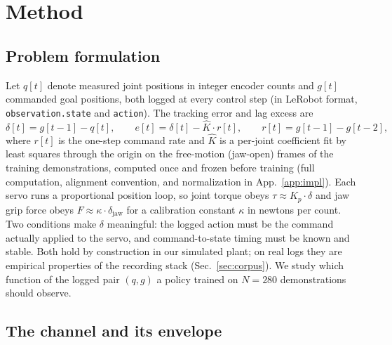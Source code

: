 \documentclass{article}
\begin{document}

\section{Method}
\label{sec:method}

\subsection{Problem formulation}
\label{sec:formulation}

Let $q[t]$ denote measured joint positions in integer encoder counts and
$g[t]$ commanded goal positions, both logged at every control step (in
LeRobot format, \texttt{observation.state} and \texttt{action}). The
tracking error and lag excess are
\begin{equation}
  \delta[t] = g[t{-}1] - q[t], \qquad
  e[t] = \delta[t] - \hat{K} \cdot r[t], \qquad r[t] = g[t{-}1] - g[t{-}2],
\end{equation}
where $r[t]$ is the one-step command rate and $\hat{K}$ is a per-joint
coefficient fit by least squares through the origin on the free-motion
(jaw-open) frames of the training demonstrations, computed once and
frozen before training (full computation, alignment convention, and
normalization in App.~\ref{app:impl}). Each servo runs a proportional
position loop, so joint torque obeys $\tau \approx K_p \cdot \delta$ and
jaw grip force obeys $F \approx \kappa \cdot \delta_{\text{jaw}}$ for a
calibration constant $\kappa$ in newtons per count. Two conditions make
$\delta$ meaningful: the logged action must be the command actually
applied to the servo, and command-to-state timing must be known and
stable. Both hold by construction in our simulated plant; on real logs
they are empirical properties of the recording stack
(Sec.~\ref{sec:corpus}). We study which function of the logged pair
$(q, g)$ a policy trained on $N = 280$ demonstrations should observe.

\subsection{The channel and its envelope}
\label{sec:channel}
\end{document}
